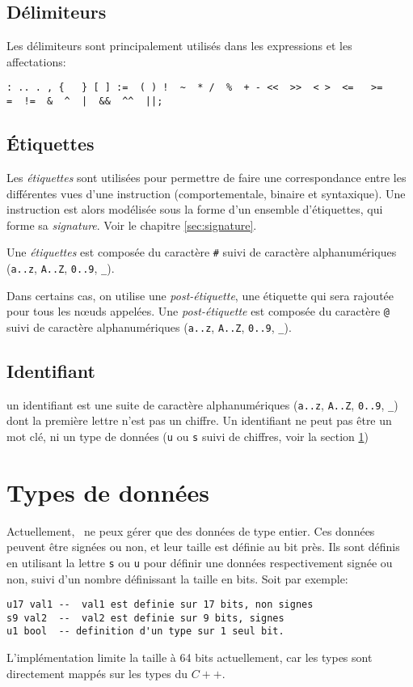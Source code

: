 \subsection{Délimiteurs}
Les délimiteurs sont principalement utilisés dans les expressions et les affectations:
\begin{lstlisting}
: .. . , {   } [ ] :=  ( ) !  ~  * /  %  + - <<  >>  < >  <=   >=  
=  !=  &  ^  |  &&  ^^  ||;
\end{lstlisting}

\subsection{Étiquettes}
\label{sec:etiquettes}
Les \emph{étiquettes} sont utilisées pour permettre de faire une correspondance entre les différentes vues d'une instruction (comportementale, binaire et syntaxique). Une instruction est alors modélisée sous la forme d'un ensemble d'étiquettes, qui forme sa \emph{signature}. Voir le chapitre \ref{sec:signature}.

Une \emph{étiquettes} est composée du caractère \texttt{\#} suivi de caractère alphanumériques (\texttt{a..z}, \texttt{A..Z}, \texttt{0..9}, \texttt{\_}).

Dans certains cas, on utilise une \emph{post-étiquette}, \cad une étiquette qui sera rajoutée pour tous les n\oe uds appelées. Une  \emph{post-étiquette} est composée du caractère \texttt{@} suivi de caractère alphanumériques (\texttt{a..z}, \texttt{A..Z}, \texttt{0..9}, \texttt{\_}).

\subsection{Identifiant}
\label{sec:identifiant}
un identifiant est une suite de caractère alphanumériques (\texttt{a..z}, \texttt{A..Z}, \texttt{0..9}, \texttt{\_}) dont la première lettre n'est pas 
un chiffre. Un identifiant ne peut pas être un mot clé, ni un type de données (\texttt{u} ou \texttt{s} suivi de chiffres, voir la section \ref{sec:TypeDonnees})

\section{Types de données}
\label{sec:TypeDonnees}
Actuellement, \harmless\ ne peux gérer que des données de type entier. Ces données peuvent être signées ou non, et leur taille est définie au bit près. Ils sont définis en utilisant la lettre \texttt{s} ou \texttt{u} pour définir une données respectivement signée ou non, suivi d'un nombre définissant la taille en bits. Soit par exemple:
\begin{lstlisting}
u17 val1 --  val1 est definie sur 17 bits, non signes
s9 val2  --  val2 est definie sur 9 bits, signes
u1 bool  -- definition d'un type sur 1 seul bit.
\end{lstlisting}
L'implémentation limite la taille à 64 bits actuellement, car les types sont directement mappés sur les types du $C++$.

